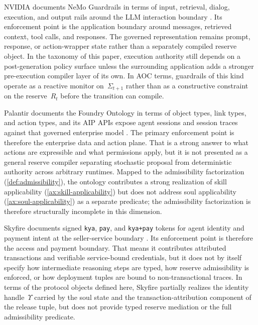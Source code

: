 \documentclass[11pt]{article}
\theoremstyle{remark}
\newcommand{\AOC}{\textup{\textsc{AOC}}}
\begin{document}
\begin{description}[style=nextline, leftmargin=1.5em]

\item[NVIDIA NeMo Guardrails --- rail-based supervision at the application boundary.]
NVIDIA documents NeMo Guardrails in terms of input, retrieval, dialog, execution, and output rails around the LLM interaction boundary \cite{nemo_guardrails}. Its enforcement point is the application boundary around messages, retrieved context, tool calls, and responses. The governed representation remains prompt, response, or action-wrapper state rather than a separately compiled reserve object. In the taxonomy of this paper, execution authority still depends on a post-generation policy surface unless the surrounding application adds a stronger pre-execution compiler layer of its own. In \AOC{} terms, guardrails of this kind operate as a reactive monitor on~$\Sigma_{t+1}$ rather than as a constructive constraint on the reserve~$R_t$ before the transition can compile.

\item[Palantir AIP --- ontology-governed enterprise action surfaces.]
Palantir documents the Foundry Ontology in terms of object types, link types, and action types, and its AIP APIs expose agent sessions and session traces against that governed enterprise model \cite{palantir_ontology,palantir_aip_agents}. The primary enforcement point is therefore the enterprise data and action plane. That is a strong answer to what actions are expressible and what permissions apply, but it is not presented as a general reserve compiler separating stochastic proposal from deterministic authority across arbitrary runtimes. Mapped to the admissibility factorization (\cref{def:admissibility}), the ontology contributes a strong realization of skill applicability (\cref{ax:skill-applicability}) but does not address soul applicability (\cref{ax:soul-applicability}) as a separate predicate; the admissibility factorization is therefore structurally incomplete in this dimension.

\item[Skyfire --- identity and payment controls for agent transactions.]
Skyfire documents signed \texttt{kya}, \texttt{pay}, and \texttt{kya+pay} tokens for agent identity and payment intent at the seller-service boundary \cite{skyfire_getting_started}. Its enforcement point is therefore the access and payment boundary. That means it contributes attributed transactions and verifiable service-bound credentials, but it does not by itself specify how intermediate reasoning steps are typed, how reserve admissibility is enforced, or how deployment tuples are bound to non-transactional traces. In terms of the protocol objects defined here, Skyfire partially realizes the identity handle~$\Upsilon$ carried by the soul state and the transaction-attribution component of the release tuple, but does not provide typed reserve mediation or the full admissibility predicate.


\end{description}
\end{document}
